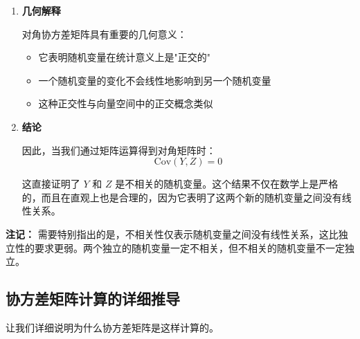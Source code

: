 \documentclass[UTF8]{report}
\theoremstyle{MyLineTheoremStyle} %
\theoremstyle{MyBlockTheoremStyle} %
\theoremstyle{MySubsubsectionStyle} %
\begin{document}
\begin{enumerate}
    \item \textbf{几何解释}
    
    对角协方差矩阵具有重要的几何意义：
    \begin{itemize}
        \item 它表明随机变量在统计意义上是"正交的"
        \item 一个随机变量的变化不会线性地影响到另一个随机变量
        \item 这种正交性与向量空间中的正交概念类似
    \end{itemize}
    
    \item \textbf{结论}
    
    因此，当我们通过矩阵运算得到对角矩阵时：
    $$
    \text{Cov}(Y,Z) = 0
    $$
    
    这直接证明了 $Y$ 和 $Z$ 是不相关的随机变量。这个结果不仅在数学上是严格的，而且在直观上也是合理的，因为它表明了这两个新的随机变量之间没有线性关系。
\end{enumerate}

\textbf{注记：} 需要特别指出的是，不相关性仅表示随机变量之间没有线性关系，这比独立性的要求更弱。两个独立的随机变量一定不相关，但不相关的随机变量不一定独立。


\subsection*{协方差矩阵计算的详细推导}

让我们详细说明为什么协方差矩阵是这样计算的。
\end{document}
